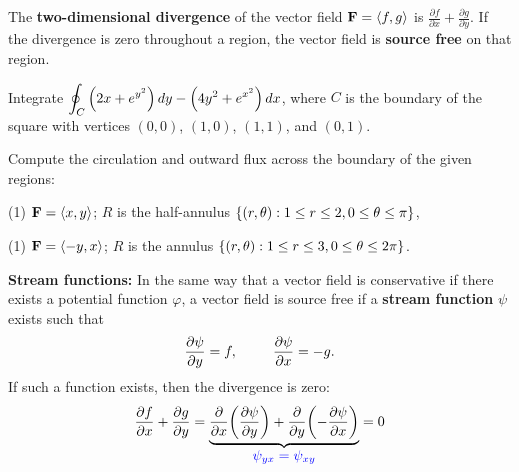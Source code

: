\documentclass[../mathNotesPreamble]{subfiles}
\begin{document}
  \begin{defn*}
    The \textbf{two-dimensional divergence} of the vector field $\mathbf F={\left\langle f,g \right\rangle}$ is $\displaystyle \frac{\partial f}{\partial x}+\frac{\partial g}{\partial y}$. If the divergence is zero throughout a region, the vector field is \textbf{source free} on that region.
  \end{defn*}
  \pagebreak


  \begin{ex*}
    Integrate $\displaystyle \oint_C {\left(2x+e^{y^2}\right)}\,dy-{\left(4y^2+e^{x^2}\right)}\,dx$, where $C$ is the boundary of the square with vertices $(0,0)$, $(1,0)$, $(1,1)$, and $(0,1)$.
  \end{ex*}
  \pagebreak

  \begin{ex*}
    Compute the circulation and outward flux across the boundary of the given regions:
  \end{ex*}
  \begin{tasks}[after-item-skip=\stretch{1}, label=](1)
    \task $\mathbf F={\left\langle x,y \right\rangle}$; $R$ is the half-annulus ${\left\{(r,\theta): 1\leq r\leq 2, 0\leq \theta\leq \pi\right\}}$,
  \end{tasks}
  \pagebreak

  \begin{tasks}[after-item-skip=\stretch{1}, label=, resume](1)
    \task $\mathbf F={\left\langle -y,x \right\rangle}$; $R$ is the annulus ${\left\{(r,\theta): 1\leq r\leq 3, 0\leq \theta\leq 2\pi\right\}}$.
  \end{tasks}
  \pagebreak

  \textbf{Stream functions:}\newline
  In the same way that a vector field is conservative if there exists a potential function $\varphi$, a vector field is source free if a \textbf{stream function} $\psi$ exists such that
    \[\frac{\partial \psi}{\partial y}=f, \hspace*{25pt} \frac{\partial \psi}{\partial x}=-g.\]
  If such a function exists, then the divergence is zero:
    \[\frac{\partial f}{\partial x}+\frac{\partial g}{\partial y}=\underbrace{\frac{\partial}{\partial x}{\left(\frac{\partial \psi}{\partial y}\right)}+\frac{\partial}{\partial y}{\left(-\frac{\partial \psi}{\partial x}\right)}}_{\textcolor{blue}{\displaystyle\psi_{yx}=\psi_{xy}}}=0\]
\end{document}

